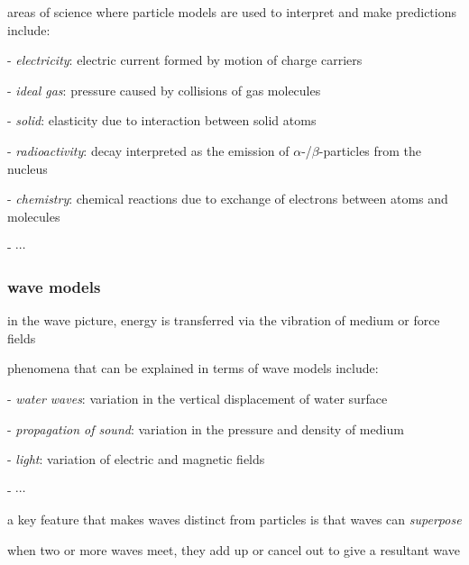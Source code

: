 \cmt areas of science where particle models are used to interpret and make predictions include:

\begin{compactenum}
	\item[-] \emph{electricity}: electric current formed by motion of charge carriers
	
	\item[-] \emph{ideal gas}: pressure caused by collisions of gas molecules
	
	\item[-] \emph{solid}: elasticity due to interaction between solid atoms
	
	\item[-] \emph{radioactivity}: decay interpreted as the emission of $\alpha$-/$\beta$-particles from the nucleus
	
	\item[-] \emph{chemistry}: chemical reactions due to exchange of electrons between atoms and molecules
	
	\item[-] $\cdots$
\end{compactenum}

\subsubsection{wave models}

in the wave picture, energy is transferred via the vibration of medium or force fields

\cmt phenomena that can be explained in terms of wave models include:

\begin{compactenum}
	\item[-] \emph{water waves}: variation in the vertical displacement of water surface
	
	\item[-] \emph{propagation of sound}: variation in the pressure and density of medium
	
	\item[-] \emph{light}: variation of electric and magnetic fields
	
	\item[-] $\cdots$
\end{compactenum}

\cmt a key feature that makes waves distinct from particles is that waves can \emph{superpose}

when two or more waves meet, they add up or cancel out to give a resultant wave

